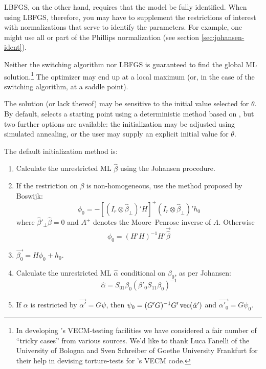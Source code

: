 LBFGS, on the other hand, requires that the model be fully identified.
When using LBFGS, therefore, you may have to supplement the
restrictions of interest with normalizations that serve to identify
the parameters.  For example, one might use all or part of the
Phillips normalization (see section \ref{sec:johansen-ident}).

Neither the switching algorithm nor LBFGS is guaranteed to find the
global ML solution.\footnote{In developing 's VECM-testing
  facilities we have considered a fair number of ``tricky cases'' from
  various sources. We'd like to thank Luca Fanelli of the University
  of Bologna and Sven Schreiber of Goethe University Frankfurt
  for their help in devising torture-tests for 's VECM
  code.} The optimizer may end up at a local maximum (or, in the case
of the switching algorithm, at a saddle point).

The solution (or lack thereof) may be sensitive to the initial value
selected for $\theta$.  By default,  selects a starting
point using a deterministic method based on \cite{boswijk95}, but two
further options are available: the initialization may be adjusted
using simulated annealing, or the user may supply an explicit initial
value for $\theta$.

The default initialization method is:
%
\begin{enumerate}
\item Calculate the unrestricted ML $\hat{\beta}$ using the
  Johansen procedure.
\item If the restriction on $\beta$ is non-homogeneous, use the
  method proposed by Boswijk:
\begin{equation}
\phi_0 = -[(I_r \otimes \hat{\beta}_{\perp})'H]^+ 
  (I_r \otimes \hat{\beta}_{\perp})' h_0
\end{equation}
where $\hat{\beta}'_{\perp} \hat{\beta} = 0$ and $A^+$ denotes
the Moore--Penrose inverse of $A$.  Otherwise
\begin{equation}
\phi_0 = (H'H)^{-1} H' \vec{\hat{\beta}}
\end{equation}
\item $\vec{\beta_0} = H\phi_0 + h_0$.
\item Calculate the unrestricted ML $\hat{\alpha}$ conditional on
  $\beta_0$, as per Johansen:
\begin{equation}
\label{eq:Jalpha}
\hat{\alpha} = S_{01} \beta_0 (\beta'_0S_{11}\beta_0)^{-1}
\end{equation}
\item If $\alpha$ is restricted by $\vec{\alpha'} = G\psi$, then
  $\psi_0 = (G'G)^{-1}G'\,{\rm vec}(\hat{\alpha}')$ and
  $\vec{\alpha'_0} = G\psi_0$.
\end{enumerate}

